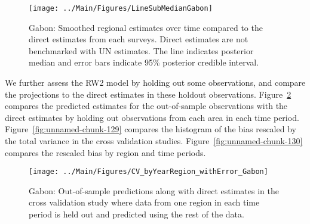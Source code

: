 \documentclass[12pt]{article}\usepackage[]{graphicx}\usepackage[]{color}
\newenvironment{knitrout}{}{} %
\begin{document}
\begin{knitrout}
\color{fgcolor}\begin{figure}[bht]

{\centering \texttt{[image: ../Main/Figures/LineSubMedianGabon]} 

}

\caption[Gabon]{Gabon: Smoothed regional estimates over time compared to the direct estimates from each surveys. Direct estimates are not benchmarked with UN estimates. The line indicates posterior median and error bars indicate 95\% posterior credible interval.}\label{fig:unnamed-chunk-127}
\end{figure}


\end{knitrout}
We further assess the RW2 model by holding out some observations, and compare the projections to the direct estimates in these holdout observations. Figure~\ref{fig:unnamed-chunk-128} compares the predicted estimates for the out-of-sample observations  with the direct estimates by holding out observations from each area in each time period.  Figure~\ref{fig:unnamed-chunk-129} compares the histogram of the bias rescaled by the total variance in the cross validation studies. Figure~\ref{fig:unnamed-chunk-130} compares the rescaled bias by region and time periods.



 
\begin{knitrout}
\color{fgcolor}\begin{figure}[bht]

{\centering \texttt{[image: ../Main/Figures/CV\_byYearRegion\_withError\_Gabon]} 

}

\caption[Gabon]{Gabon: Out-of-sample predictions along with direct estimates in the cross validation study where data from one region in each time period is held out and predicted using the rest of the data.}\label{fig:unnamed-chunk-128}
\end{figure}


\end{knitrout}
\end{document}
